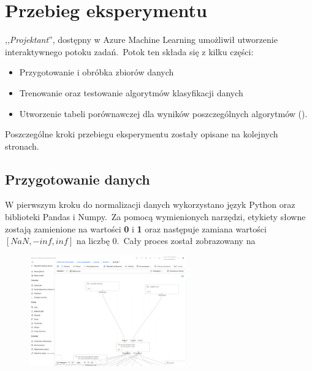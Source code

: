 

\section{Przebieg eksperymentu}

,,\textit{Projektant}'', dostępny w Azure Machine Learning umożliwił utworzenie interaktywnego potoku zadań.\ Potok ten składa się z kilku części:
\begin{itemize}
    \item Przygotowanie i obróbka zbiorów danych
    \item Trenowanie oraz testowanie algorytmów klasyfikacji danych
    \item Utworzenie tabeli porównawczej dla wyników poszczególnych algorytmów ().
\end{itemize}

Poszczególne kroki przebiegu eksperymentu zostały opisane na kolejnych stronach.

\subsection{Przygotowanie danych}
W pierwszym kroku do normalizacji danych wykorzystano język Python oraz biblioteki Pandas i Numpy.\ Za pomocą wymienionych narzędzi, etykiety słowne zostają zamienione na wartości \textbf{0} i \textbf{1} oraz następuje zamiana wartości $[NaN, -inf, inf]$ na liczbę $0$.\ Cały proces został zobrazowany na 

\begin{figure}[H]
    \centering
    \includegraphics[width=0.6\textwidth]{images/data_pipe}
    \label{fig:norm}
\end{figure}

\vfill
\pagebreak

